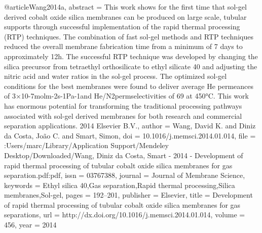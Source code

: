 @article{Wang2014a,
abstract = {This work shows for the first time that sol-gel derived cobalt oxide silica membranes can be produced on large scale, tubular supports through successful implementation of the rapid thermal processing (RTP) techniques. The combination of fast sol-gel methods and RTP techniques reduced the overall membrane fabrication time from a minimum of 7 days to approximately 12h. The successful RTP technique was developed by changing the silica precursor from tetraethyl orthosilicate to ethyl silicate 40 and adjusting the nitric acid and water ratios in the sol-gel process. The optimized sol-gel conditions for the best membranes were found to deliver average He permeances of 3×10-7molm-2s-1Pa-1and He/N2permselectivities of 69 at 450°C. This work has enormous potential for transforming the traditional processing pathways associated with sol-gel derived membranes for both research and commercial separation applications. {\textcopyright} 2014 Elsevier B.V.},
author = {Wang, David K. and {Diniz da Costa}, Jo{\~{a}}o C. and Smart, Simon},
doi = {10.1016/j.memsci.2014.01.014},
file = {:Users/marc/Library/Application Support/Mendeley Desktop/Downloaded/Wang, Diniz da Costa, Smart - 2014 - Development of rapid thermal processing of tubular cobalt oxide silica membranes for gas separation.pdf:pdf},
issn = {03767388},
journal = {Journal of Membrane Science},
keywords = {Ethyl silica 40,Gas separation,Rapid thermal processing,Silica membranes,Sol-gel},
pages = {192--201},
publisher = {Elsevier},
title = {{Development of rapid thermal processing of tubular cobalt oxide silica membranes for gas separations}},
url = {http://dx.doi.org/10.1016/j.memsci.2014.01.014},
volume = {456},
year = {2014}
}
